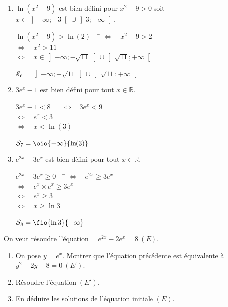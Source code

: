 \documentclass[a4paper,11pt,exos]{nsi} %
\begin{document}
{\begin{enumerate}
\begin{tabbing}
                \> $\iff \quad x\geqslant -5$
            \end{tabbing}
            $\mathcal{S}_5=\oio{4}{+\infty}$
            \item $\ln(x^2-9)$ est bien défini pour $x^2-9>0$ soit $x\in\left]-\infty;-3\right[\cup\left]3;+\infty\right[$.
            \begin{tabbing}
                $\ln(x^2-9)>\ln(2)\quad$ \= $\iff \quad x^2-9>2$\\
                \> $\iff \quad x^2>11$\\
                \> $\iff \quad x\in\left]-\infty;-\sqrt{11}\right[\cup\left]\sqrt{11};+\infty\right[$
            \end{tabbing}
            $\mathcal{S}_6=\left]-\infty;-\sqrt{11}\right[\cup\left]\sqrt{11};+\infty\right[$
            \item $3e^x-1$ est bien défini pour tout $x\in\mathbb{R}$.
            \begin{tabbing}
                $3e^x-1<8\quad$ \= $\iff \quad 3e^x<9$\\
                \> $\iff \quad e^x<3$\\
                \> $\iff \quad x<\ln(3)$
            \end{tabbing}
            $\mathcal{S}_7=\oio{-\infty}{\ln(3)}$
            \item $e^{2x}-3e^x$ est bien défini pour tout $x\in\mathbb{R}$.
            \begin{tabbing}
                $e^{2x}-3e^x\geqslant 0\quad$ \= $\iff \quad e^{2x}\geqslant 3e^x$\\
                \> $\iff \quad e^x\times e^x\geqslant 3e^x$\\
                \> $\iff \quad e^x\geqslant 3$\\
                \> $\iff \quad x\geqslant \ln 3$
            \end{tabbing}
            $\mathcal{S}_8=\fio{\ln 3}{+\infty}$
        \end{enumerate}
}


\exo{ \faStar}
On veut résoudre l'équation $\quad e^{2x}-2e^x=8\ (E)$.
\begin{enumerate}
    \item On pose $y=e^x$. Montrer que l'équation précédente est équivalente à $y^2-2y-8=0\ (E')$.
    \item Résoudre l'équation $(E')$.
    \item En déduire les solutions de l'équation initiale $(E)$.
\end{enumerate}
\end{document}
